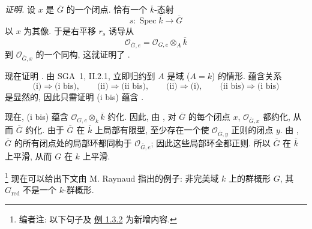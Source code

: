 \noindent\textit{证明.}
设 \(x\) 是 \(\overline G\) 的一个闭点.
恰有一个 \(\overline k\)-态射
\[
  s:\operatorname{Spec}\overline k\longrightarrow\overline G
\]
以 \(x\) 为其像.
于是右平移 \(r_s\) 诱导从
\[
  \mathcal O_{\overline G,e}
    =\mathcal O_{G,e}\otimes_A\overline k
\]
到 \(\mathcal O_{\overline G,x}\) 的一个同构,
这就证明了 .

现在证明 .
由 SGA~1, II.2.1, 立即归约到 \(A\) 是域 (\(A=k\)) 的情形.
蕴含关系
\[
  \text{(i)}\Rightarrow\text{(i bis)},\qquad
  \text{(ii)}\Rightarrow\text{(ii bis)},\qquad
  \text{(ii)}\Rightarrow\text{(i)},\qquad
  \text{(ii bis)}\Rightarrow\text{(i bis)}
\]
是显然的, 因此只需证明 (i bis) 蕴含
.

现在, (i bis) 蕴含 \(\mathcal O_{G,e}\otimes_k\overline k\) 约化.
因此, 由 ,
对 \(\overline G\) 的每个闭点 \(x\),
\(\mathcal O_{\overline G,x}\) 都约化,
从而 \(\overline G\) 约化.
由于 \(\overline G\) 在 \(\overline k\) 上局部有限型,
至少存在一个使 \(\mathcal O_{\overline G,y}\) 正则的闭点 \(y\).
由 ,
\(\overline G\) 的所有闭点处的局部环都同构于 \(\mathcal O_{\overline G,e}\);
因此这些局部环全都正则.
所以 \(\overline G\) 在 \(\overline k\) 上平滑,
从而 \(G\) 在 \(k\) 上平滑.

\footnote{\label{note:sga3-VIA-15}编者注: 以下句子及
\hyperref[ex:sga3-VIA-1.3.2]{例 1.3.2} 为新增内容.}
现在可以给出下文由 M. Raynaud 指出的例子:
非完美域 \(k\) 上的群概形 \(G\),
其 \(G_{\mathrm{red}}\) 不是一个 \(k\)-群概形.

